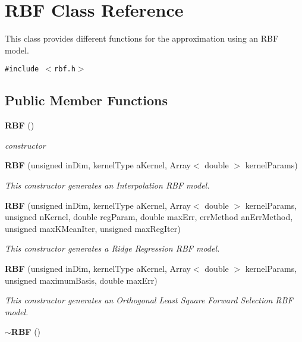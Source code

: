 \section{RBF Class Reference}
\label{classRBF}
This class provides different functions for the approximation using an RBF model.  


{\tt \#include $<$rbf.h$>$}

\subsection*{Public Member Functions}
\begin{CompactItemize}
\item 
{\bf RBF} ()\label{classRBF_a0}

\begin{CompactList}\small\item\em constructor \item\end{CompactList}\item 
{\bf RBF} (unsigned in\-Dim, kernel\-Type a\-Kernel, Array$<$ double $>$ kernel\-Params)
\begin{CompactList}\small\item\em This constructor generates an Interpolation RBF model. \item\end{CompactList}\item 
{\bf RBF} (unsigned in\-Dim, kernel\-Type a\-Kernel, Array$<$ double $>$ kernel\-Params, unsigned n\-Kernel, double reg\-Param, double max\-Err, err\-Method an\-Err\-Method, unsigned max\-KMean\-Iter, unsigned max\-Reg\-Iter)
\begin{CompactList}\small\item\em This constructor generates a Ridge Regression RBF model. \item\end{CompactList}\item 
{\bf RBF} (unsigned in\-Dim, kernel\-Type a\-Kernel, Array$<$ double $>$ kernel\-Params, unsigned maximum\-Basis, double max\-Err)
\begin{CompactList}\small\item\em This constructor generates an Orthogonal Least Square Forward Selection RBF model. \item\end{CompactList}\item 
{\bf $\sim$RBF} ()\label{classRBF_a4}


\end{CompactItemize}
